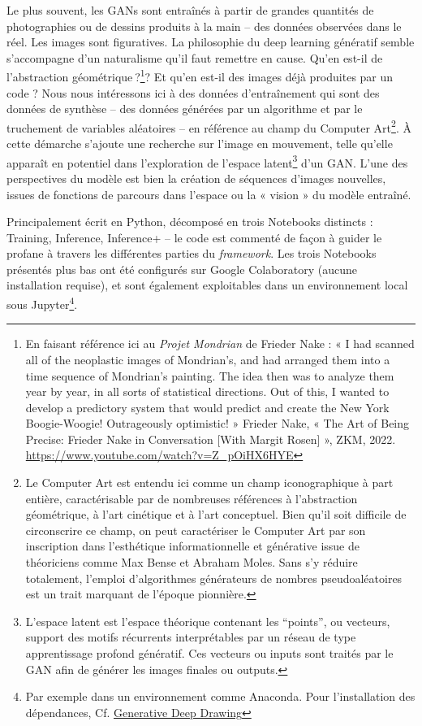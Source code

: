 \documentclass[
]{article}
\begin{document}
Le plus souvent, les GANs sont entraînés à partir de grandes quantités de photographies ou de dessins produits à la main -- des données observées dans le réel. Les images sont figuratives. La philosophie du deep learning génératif semble s'accompagne d'un naturalisme qu'il faut remettre en cause. Qu'en est-il de l'abstraction géométrique ?\footnote{En faisant référence ici au \emph{Projet Mondrian} de Frieder Nake : « I had scanned all of the neoplastic images of Mondrian's, and had arranged them into a time sequence of Mondrian's painting. The idea then was to analyze them year by year, in all sorts of statistical directions. Out of this, I wanted to develop a predictory system that would predict and create the New York Boogie-Woogie! Outrageously optimistic! » Frieder Nake, « The Art of Being Precise: Frieder Nake in Conversation {[}With Margit Rosen{]} », ZKM, 2022. \url{https://www.youtube.com/watch?v=Z_pOiHX6HYE}}? Et qu'en est-il des images déjà produites par un code ? Nous nous intéressons ici à des données d'entraînement qui sont des données de synthèse -- des données générées par un algorithme et par le truchement de variables aléatoires -- en référence au champ du Computer Art\footnote{Le Computer Art est entendu ici comme un champ iconographique à part entière, caractérisable par de nombreuses références à l'abstraction géométrique, à l'art cinétique et à l'art conceptuel. Bien qu'il soit difficile de circonscrire ce champ, on peut caractériser le Computer Art par son inscription dans l'esthétique informationnelle et générative issue de théoriciens comme Max Bense et Abraham Moles. Sans s'y réduire totalement, l'emploi d'algorithmes générateurs de nombres pseudoaléatoires est un trait marquant de l'époque pionnière.}. À cette démarche s'ajoute une recherche sur l'image en mouvement, telle qu'elle apparaît en potentiel dans l'exploration de l'espace latent\footnote{L'espace latent est l'espace théorique contenant les ``points'', ou vecteurs, support des motifs récurrents interprétables par un réseau de type apprentissage profond génératif. Ces vecteurs ou inputs sont traités par le GAN afin de générer les images finales ou outputs.} d'un GAN. L'une des perspectives du modèle est bien la création de séquences d'images nouvelles, issues de fonctions de parcours dans l'espace ou la « vision » du modèle entraîné.

Principalement écrit en Python, décomposé en trois Notebooks distincts : Training, Inference, Inference+ -- le code est commenté de façon à guider le profane à travers les différentes parties du \emph{framework}. Les trois Notebooks présentés plus bas ont été configurés sur Google Colaboratory (aucune installation requise), et sont également exploitables dans un environnement local sous Jupyter\footnote{Par exemple dans un environnement comme Anaconda. Pour l'installation des dépendances, Cf. \href{https://github.com/leogenot/DeepDrawing}{Generative Deep Drawing}}.
\end{document}
